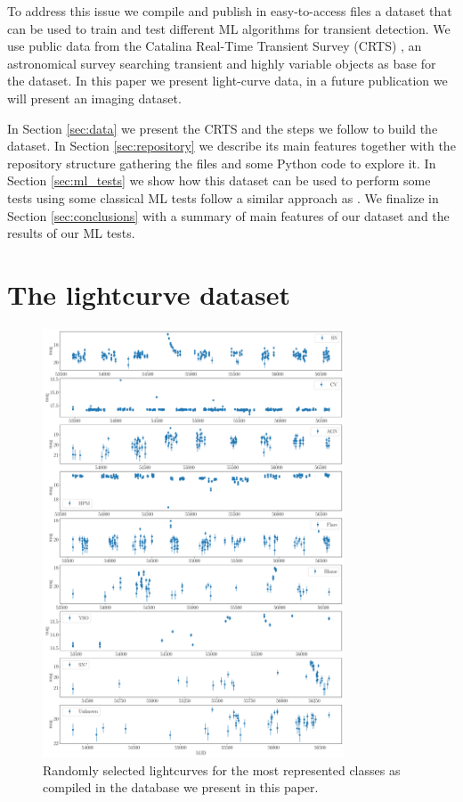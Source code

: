 \documentclass[a4paper,fleqn,usenatbib]{mnras}
\begin{document}
To address this issue we compile and publish in easy-to-access files a
dataset that can be used to train and test different ML algorithms for
transient detection.
We use public data from the Catalina Real-Time Transient Survey
(CRTS) \citep{1111.2566}, an astronomical survey searching transient
and highly variable objects as base for the dataset.
In this paper we present light-curve data, in a future publication we
will present an imaging dataset. 

In Section \ref{sec:data} we present the CRTS and the steps we follow
to build the dataset.
In Section \ref{sec:repository} we describe its main features together
with the repository structure gathering the files and some Python code  
to explore it.
In Section \ref{sec:ml_tests} we show how this dataset can be used to
perform some tests using some classical ML tests follow a similar
approach as \cite{1601.03931}.  
We finalize in Section \ref{sec:conclusions} with a summary of main
features of our dataset and the results of our ML tests.

\section{The lightcurve dataset} \label{section_data}


\begin{figure}
  \includegraphics[width=0.8\textwidth]{examples.pdf}
  \caption{Randomly selected lightcurves for the most represented classes as
    compiled in the database we present in this paper.}  
  \label{fig:examples}
\end{figure} 
\end{document}
